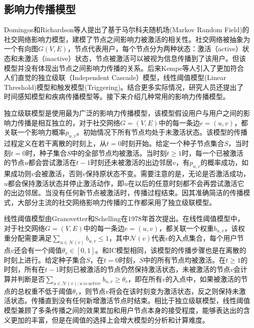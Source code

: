 \subsection{影响力传播模型}

Domingos和Richardson等人\cite{domingos2001mining}提出了基于马尔科夫随机场(Markov Random Field)的社交网络影响力模型，建模了节点之间影响力被激活的相关性。社交网络被抽象为一个有向图$G(V,E)$，节点代表用户，每个节点分为两种状态：激活（active）状态和未激活（inactive）状态，节点被激活可以被视为信息传播到了该用户。但该模型并没有体现出节点之间影响力传播的关系。后来Kempe等人\cite{kempe2003maximizing}引入了更加符合人们直觉的独立级联（Independent Cascade）模型，线性阈值模型(Linear Threshold)模型和触发模型(Triggering)。结合更多实际情况，研究人员还提出了时间感知模型\cite{chen2012time}和疾病传播模型\cite{shah2010detecting}等。接下来介绍几种常用的影响力传播模型。

独立级联模型是使用最为广泛的影响力传播模型，该模型假设用户与用户之间的影响力传播是相互独立的，对于社交网络$G=(V,E)$中的每一条边$e=(u,v)$，都关联一个影响力概率$p_{u,v}$。初始情况下所有节点均处于未激活状态。该模型的传播过程定义在若干离散的时刻上，从$t=0$时刻开始。给定一个种子节点集合$S$，当时刻$t=0$时，种子集合$S$中的全部节点均被激活。当时刻$t \ge 1$时，每一个已被激活的节点$u$都会尝试激活在$t-1$时刻还未被激活的出边邻居$v$，有$p_{u,v}$的概率成功，如果成功则$v$会被激活，否则$v$保持原状态不变。需要注意的是，无论是否激活成功，$u$都会保持激活状态并停止激活动作，即$u$在以后的任意时刻都不会再尝试激活它的出边邻居。当没有任何新节点被激活时，传播过程结束。因其准确简洁的传播模式，大部分主流的社交网络影响力传播的工作都采用了独立级联模型。

线性阈值模型由Granovetter和Schelling在1978年首次提出\cite{granovetter1978threshold}。在线性阈值模型中，对于社交网络$G=(V,E)$中的每一条边$e=(u,v)$，都关联一个权重$b_{u,v}$，该权重分配需要满足$\sum_{u \in \mathcal{N}(v)}b_{u,v}\le1$，其中$\mathcal{N}(v)$代表$v$的入点集合，每个用户节点$v$还会有一个阈值$\theta_v \in [0,1]$。和IC模型相同，该模型的传播步骤也是在离散的时刻上进行。给定种子集合$S$，在$t=0$时刻，$S$中的所有节点均被激活。在$t\ge1$的时刻，所有在$t-1$时刻已被激活的节点仍然保持激活状态，未被激活的节点$v$会计算并判断是否$\sum_{u \in \mathcal{N}(v);u \ is \ active} b_{u,v} \ge \theta_v$，即在所有$v$的入点中，如果被激活的节点的总权重不低于阈值$\theta_v$，则节点$v$将会在该时刻变为激活状态，反之则保持未激活状态。传播直到没有任何新增激活节点时结束。相比于独立级联模型，线性阈值模型兼顾了多条传播之间的效果累加和用户节点本身的接受程度，能够表达出的含义更加的丰富，但是在阈值的选择上会增大模型的分析和计算难度\cite{chen2013information}。

